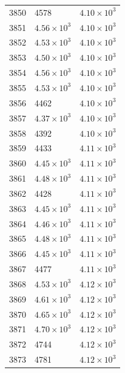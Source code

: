 \begin{table}[H]
\begin{tabular}{lll}
3850 & 4578 & $\displaystyle 4.10 \times 10^{3}$ \\
3851 & $\displaystyle 4.56 \times 10^{3}$ & $\displaystyle 4.10 \times 10^{3}$ \\
3852 & $\displaystyle 4.53 \times 10^{3}$ & $\displaystyle 4.10 \times 10^{3}$ \\
3853 & $\displaystyle 4.50 \times 10^{3}$ & $\displaystyle 4.10 \times 10^{3}$ \\
3854 & $\displaystyle 4.56 \times 10^{3}$ & $\displaystyle 4.10 \times 10^{3}$ \\
3855 & $\displaystyle 4.53 \times 10^{3}$ & $\displaystyle 4.10 \times 10^{3}$ \\
3856 & 4462 & $\displaystyle 4.10 \times 10^{3}$ \\
3857 & $\displaystyle 4.37 \times 10^{3}$ & $\displaystyle 4.10 \times 10^{3}$ \\
3858 & 4392 & $\displaystyle 4.10 \times 10^{3}$ \\
3859 & 4433 & $\displaystyle 4.11 \times 10^{3}$ \\
3860 & $\displaystyle 4.45 \times 10^{3}$ & $\displaystyle 4.11 \times 10^{3}$ \\
3861 & $\displaystyle 4.48 \times 10^{3}$ & $\displaystyle 4.11 \times 10^{3}$ \\
3862 & 4428 & $\displaystyle 4.11 \times 10^{3}$ \\
3863 & $\displaystyle 4.45 \times 10^{3}$ & $\displaystyle 4.11 \times 10^{3}$ \\
3864 & $\displaystyle 4.46 \times 10^{3}$ & $\displaystyle 4.11 \times 10^{3}$ \\
3865 & $\displaystyle 4.48 \times 10^{3}$ & $\displaystyle 4.11 \times 10^{3}$ \\
3866 & $\displaystyle 4.45 \times 10^{3}$ & $\displaystyle 4.11 \times 10^{3}$ \\
3867 & 4477 & $\displaystyle 4.11 \times 10^{3}$ \\
3868 & $\displaystyle 4.53 \times 10^{3}$ & $\displaystyle 4.12 \times 10^{3}$ \\
3869 & $\displaystyle 4.61 \times 10^{3}$ & $\displaystyle 4.12 \times 10^{3}$ \\
3870 & $\displaystyle 4.65 \times 10^{3}$ & $\displaystyle 4.12 \times 10^{3}$ \\
3871 & $\displaystyle 4.70 \times 10^{3}$ & $\displaystyle 4.12 \times 10^{3}$ \\
3872 & 4744 & $\displaystyle 4.12 \times 10^{3}$ \\
3873 & 4781 & $\displaystyle 4.12 \times 10^{3}$ \\

\end{tabular}
\end{table}
